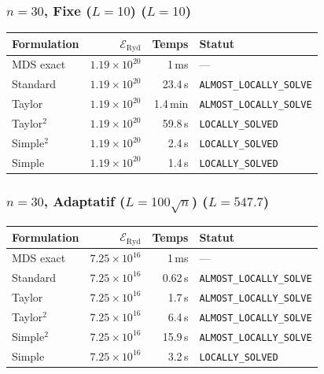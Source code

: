 \subsubsection{$n=30$, Fixe ($L{=}10$) ($L=10$)}
\begin{longtable}{@{}lrrl@{}}
  \toprule
  Formulation & $\mathcal{E}_{\mathrm{Ryd}}$ & Temps & Statut \\
  \midrule
  \endhead
  MDS exact & $1.19\times10^{20}$ & 1\,ms & --- \\
  Standard & $1.19\times10^{20}$ & 23.4\,s & \texttt{ALMOST\_LOCALLY\_SOLVE} \\
  Taylor & $1.19\times10^{20}$ & 1.4\,min & \texttt{ALMOST\_LOCALLY\_SOLVE} \\
  Taylor$^2$ & $1.19\times10^{20}$ & 59.8\,s & \texttt{LOCALLY\_SOLVED} \\
  Simple$^2$ & $1.19\times10^{20}$ & 2.4\,s & \texttt{LOCALLY\_SOLVED} \\
  Simple & $1.19\times10^{20}$ & 1.4\,s & \texttt{LOCALLY\_SOLVED} \\
  \bottomrule
\end{longtable}

\subsubsection{$n=30$, Adaptatif ($L{=}100\sqrt{n}$) ($L=547.7$)}
\begin{longtable}{@{}lrrl@{}}
  \toprule
  Formulation & $\mathcal{E}_{\mathrm{Ryd}}$ & Temps & Statut \\
  \midrule
  \endhead
  MDS exact & $7.25\times10^{16}$ & 1\,ms & --- \\
  Standard & $7.25\times10^{16}$ & 0.62\,s & \texttt{ALMOST\_LOCALLY\_SOLVE} \\
  Taylor & $7.25\times10^{16}$ & 1.7\,s & \texttt{ALMOST\_LOCALLY\_SOLVE} \\
  Taylor$^2$ & $7.25\times10^{16}$ & 6.4\,s & \texttt{ALMOST\_LOCALLY\_SOLVE} \\
  Simple$^2$ & $7.25\times10^{16}$ & 15.9\,s & \texttt{ALMOST\_LOCALLY\_SOLVE} \\
  Simple & $7.25\times10^{16}$ & 3.2\,s & \texttt{LOCALLY\_SOLVED} \\
  \bottomrule
\end{longtable}

